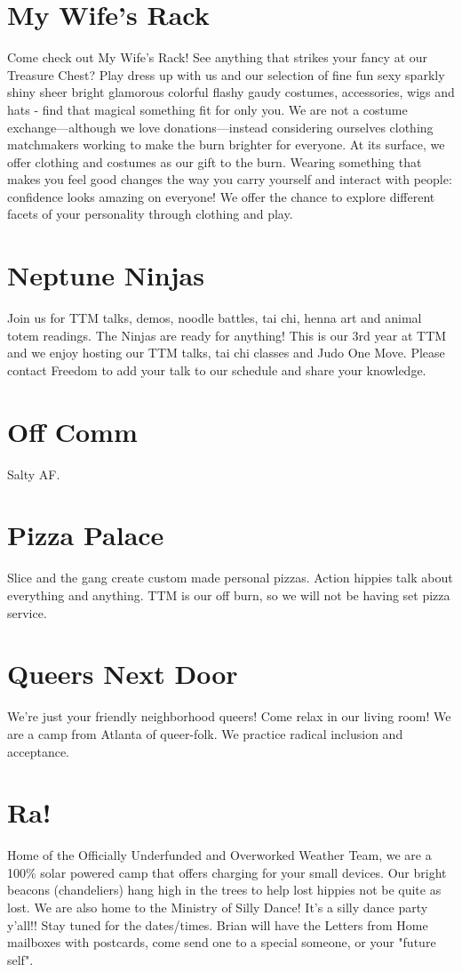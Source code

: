 \begin{multicols}{2}
\section*{My Wife’s Rack}
Come check out My Wife's Rack! See anything that strikes your fancy at our Treasure Chest? Play dress up with us and our selection of fine fun sexy sparkly shiny sheer bright glamorous colorful flashy gaudy costumes, accessories, wigs and hats - find that magical something fit for only you. We are not a costume exchange—although we love donations—instead considering ourselves clothing matchmakers working to make the burn brighter for everyone. At its surface, we offer clothing and costumes as our gift to the burn. Wearing something that makes you feel good changes the way you carry yourself and interact with people: confidence looks amazing on everyone! We offer the chance to explore different facets of your personality through clothing and play.


\section*{Neptune Ninjas}
Join us for TTM talks, demos, noodle battles, tai chi, henna art and animal totem readings. The Ninjas are ready for anything! This is our 3rd year at TTM and we enjoy hosting our TTM talks, tai chi classes and Judo One Move. Please contact Freedom to add your talk to our schedule and share your knowledge. 


\section*{Off Comm}
Salty AF.


\section*{Pizza Palace}
Slice and the gang create custom made personal pizzas. Action hippies talk about everything and anything. TTM is our off burn, so we will not be having set pizza service. 


\section*{Queers Next Door}
We're just your friendly neighborhood queers! Come relax in our living room! We are a camp from Atlanta of queer-folk. We practice radical inclusion and acceptance.


\section*{Ra!}
Home of the Officially Underfunded and Overworked Weather Team, we are a 100\% solar powered camp that offers charging for your small devices. Our bright beacons (chandeliers) hang high in the trees to help lost hippies not be quite as lost. We are also home to the Ministry of Silly Dance! It’s a silly dance party y’all!! Stay tuned for the dates/times. Brian will have the Letters from Home mailboxes with postcards, come send one to a special someone, or your "future self".



\end{multicols}

